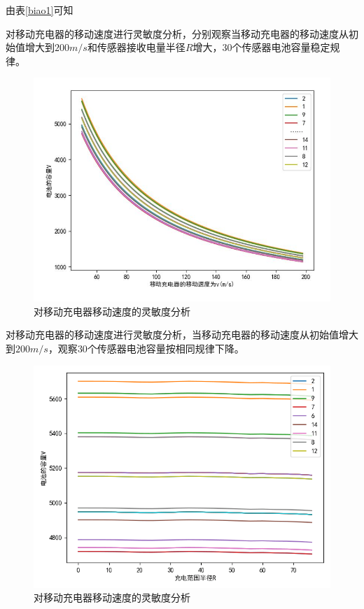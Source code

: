 \documentclass{whutmod}
\begin{document}
  			由表\ref{biao1}可知
			
			对移动充电器的移动速度进行灵敏度分析，分别观察当移动充电器的移动速度从初始值增大到$200m/s$和传感器接收电量半径$R$增大，$30$个传感器电池容量稳定规律。
			\begin{figure}[H]
				\centering
				\includegraphics[width=\textwidth]{figures/2333.jpg}
				\caption{对移动充电器移动速度的灵敏度分析}\label{lssss}
			\end{figure}
			对移动充电器的移动速度进行灵敏度分析，当移动充电器的移动速度从初始值增大到$200m/s$，观察$30$个传感器电池容量按相同规律下降。
			\begin{figure}[H]
				\centering
				\includegraphics[width=\textwidth]{figures/23333.png}
				\caption{对移动充电器移动速度的灵敏度分析}\label{lssssrr}
			\end{figure}
\end{document}
